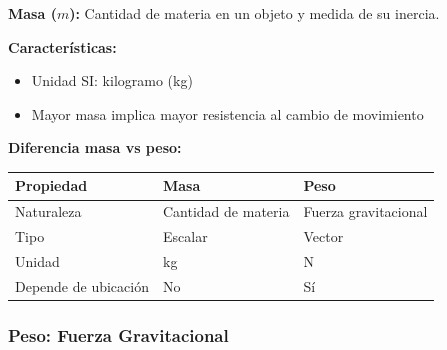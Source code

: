 \begin{seccion}
\begin{definicion}
    \textbf{Masa ($m$):} Cantidad de materia en un objeto y medida de su inercia.
\end{definicion}

\textbf{Características:}
\begin{itemize}
    \item Unidad SI: kilogramo (kg)
    \item Mayor masa implica mayor resistencia al cambio de movimiento
\end{itemize}

\textbf{Diferencia masa vs peso:}
\begin{center}
\begin{tabular}{|l|l|l|}
\hline
\rowcolor{azulmedio!30}
\textbf{Propiedad} & \textbf{Masa} & \textbf{Peso} \\
\hline
Naturaleza & Cantidad de materia & Fuerza gravitacional \\
\hline
Tipo & Escalar & Vector \\
\hline
Unidad & kg & N \\
\hline
Depende de ubicación & No & Sí \\
\hline
\end{tabular}
\end{center}
\end{seccion}

\newpage

\subsubsection{Peso: Fuerza Gravitacional}

